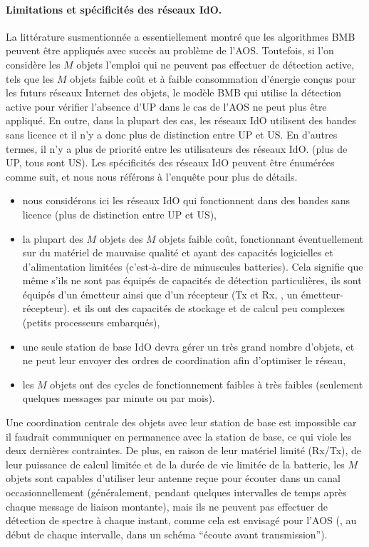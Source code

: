 \begin{resume_fr}
\paragraph{Limitations et spécificités des réseaux IdO.}
%
La littérature susmentionnée a essentiellement montré que les algorithmes BMB peuvent être appliqués avec succès au problème de l'AOS.
Toutefois, si l'on considère les $M$ objets l'emploi qui ne peuvent pas effectuer de détection active, tels que les $M$ objets faible coût et à faible consommation d'énergie conçus pour les futurs réseaux Internet des objets, le modèle BMB qui utilise la détection active pour vérifier l'absence d'UP dans le cas de l'AOS ne peut plus être appliqué.
En outre, dans la plupart des cas, les réseaux IdO utilisent des bandes sans licence et il n'y a donc plus de distinction entre UP et US.
En d'autres termes, il n'y a plus de priorité entre les utilisateurs des réseaux IdO.
(plus de UP, tous sont US).
%
Les spécificités des réseaux IdO peuvent être énumérées comme suit,
et nous nous référons à l'enquête \cite{Centenaro16} pour plus de détails.
%
\begin{itemize}\tightlist
    \item
    nous considérons ici les réseaux IdO qui fonctionnent dans des bandes sans licence (plus de distinction entre UP et US),
    \item
    la plupart des $M$ objets des $M$ objets faible coût, fonctionnant éventuellement sur du matériel de mauvaise qualité et ayant des capacités logicielles et d'alimentation limitées (c'est-à-dire de minuscules batteries).
    Cela signifie que même s'ils ne sont pas équipés de capacités de détection particulières,
    ils sont équipés d'un émetteur ainsi que d'un récepteur (Tx et Rx, \ie, un émetteur-récepteur).
    et ils ont des capacités de stockage et de calcul peu complexes (petits processeurs embarqués),
    \item
    une seule station de base IdO devra gérer un très grand nombre d'objets,
    et ne peut leur envoyer des ordres de coordination afin d'optimiser le réseau,
    \item
    les $M$ objets ont des cycles de fonctionnement faibles à très faibles (seulement quelques messages par minute ou par mois).
\end{itemize}

Une coordination centrale des objets avec leur station de base est impossible car il faudrait communiquer en permanence avec la station de base, ce qui viole les deux dernières contraintes.
%
De plus, en raison de leur matériel limité (Rx/Tx), de leur puissance de calcul limitée et de la durée de vie limitée de la batterie, les $M$ objets sont capables d'utiliser leur antenne reçue pour écouter dans un canal occasionnellement (généralement, pendant quelques intervalles de temps après chaque message de liaison montante), mais ils ne peuvent pas effectuer de détection de spectre à chaque instant, comme cela est envisagé pour l'AOS (\ie, au début de chaque intervalle, dans un schéma ``écoute avant transmission'').


\end{resume_fr}

